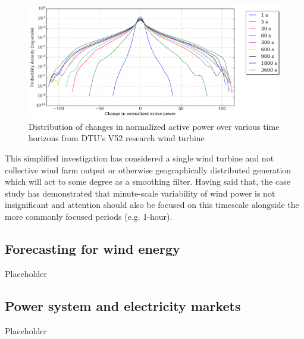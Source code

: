 \begin{figure}[htbp]
    \centering
        \includegraphics[width=1.0\textwidth]{graphics/intro/variability/norm_act_pow_error_dist.png}
    \caption{Distribution of changes in normalized active power over various time horizons from DTU's V52 research wind turbine}
    \label{fig:norm_act_pow_error_dist}
\end{figure}

This simplified investigation has considered a single wind turbine and not collective wind farm output or otherwise geographically distributed generation which will act to some degree as a smoothing filter. Having said that, the case study has demonstrated that minute-scale variability of wind power is not insignificant and attention should also be focused on this timescale alongside the more commonly focused periods (e.g. 1-hour).

\clearpage
\subsection{Forecasting for wind energy}
\label{sec:intro_forecasting}

Placeholder


\clearpage
\subsection{Power system and electricity markets}
\label{sec:intro_power_markets}

Placeholder

